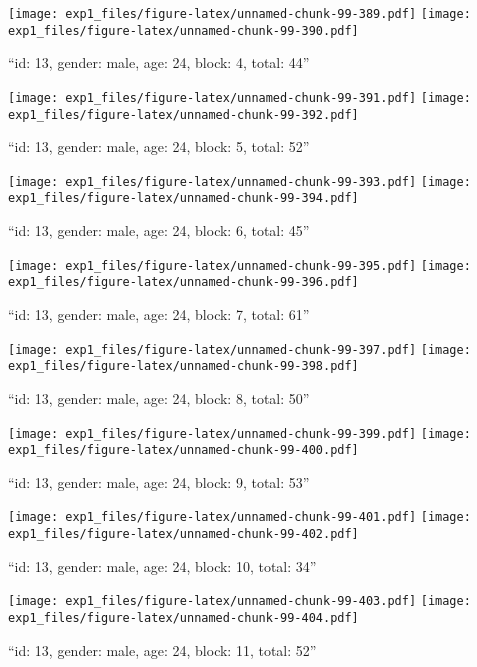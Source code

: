 \documentclass[,]{article}
\begin{document}
\texttt{[image: exp1\_files/figure-latex/unnamed-chunk-99-389.pdf]}
\texttt{[image: exp1\_files/figure-latex/unnamed-chunk-99-390.pdf]}

\newpage
[1] 

``id: 13, gender: male, age: 24, block: 4, total: 44''

\texttt{[image: exp1\_files/figure-latex/unnamed-chunk-99-391.pdf]}
\texttt{[image: exp1\_files/figure-latex/unnamed-chunk-99-392.pdf]}

\newpage
[1] 

``id: 13, gender: male, age: 24, block: 5, total: 52''

\texttt{[image: exp1\_files/figure-latex/unnamed-chunk-99-393.pdf]}
\texttt{[image: exp1\_files/figure-latex/unnamed-chunk-99-394.pdf]}

\newpage
[1] 

``id: 13, gender: male, age: 24, block: 6, total: 45''

\texttt{[image: exp1\_files/figure-latex/unnamed-chunk-99-395.pdf]}
\texttt{[image: exp1\_files/figure-latex/unnamed-chunk-99-396.pdf]}

\newpage
[1] 

``id: 13, gender: male, age: 24, block: 7, total: 61''

\texttt{[image: exp1\_files/figure-latex/unnamed-chunk-99-397.pdf]}
\texttt{[image: exp1\_files/figure-latex/unnamed-chunk-99-398.pdf]}

\newpage
[1] 

``id: 13, gender: male, age: 24, block: 8, total: 50''

\texttt{[image: exp1\_files/figure-latex/unnamed-chunk-99-399.pdf]}
\texttt{[image: exp1\_files/figure-latex/unnamed-chunk-99-400.pdf]}

\newpage
[1] 

``id: 13, gender: male, age: 24, block: 9, total: 53''

\texttt{[image: exp1\_files/figure-latex/unnamed-chunk-99-401.pdf]}
\texttt{[image: exp1\_files/figure-latex/unnamed-chunk-99-402.pdf]}

\newpage
[1] 

``id: 13, gender: male, age: 24, block: 10, total: 34''

\texttt{[image: exp1\_files/figure-latex/unnamed-chunk-99-403.pdf]}
\texttt{[image: exp1\_files/figure-latex/unnamed-chunk-99-404.pdf]}

\newpage
[1] 

``id: 13, gender: male, age: 24, block: 11, total: 52''
\end{document}
